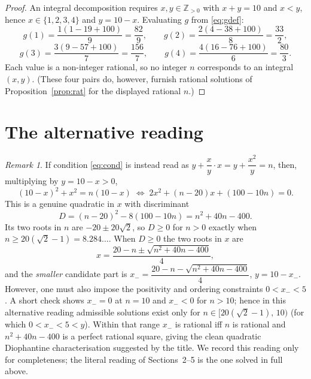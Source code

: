 \documentclass{amsart}
\theoremstyle{remark}
\newtheorem{remark}{Remark}
\begin{document}
\begin{proof}
An integral decomposition requires $x,y\in\mathbb{Z}_{>0}$ with $x+y=10$ and
$x<y$, hence $x\in\{1,2,3,4\}$ and $y=10-x$. Evaluating $g$ from
\eqref{eq:gdef}:
\[
g(1)=\frac{1(1-19+100)}{9}=\frac{82}{9},\qquad
g(2)=\frac{2(4-38+100)}{8}=\frac{33}{2},
\]
\[
g(3)=\frac{3(9-57+100)}{7}=\frac{156}{7},\qquad
g(4)=\frac{4(16-76+100)}{6}=\frac{80}{3}.
\]
Each value is a non-integer rational, so no integer $n$ corresponds to an
integral $(x,y)$. (These four pairs do, however, furnish rational solutions of
Proposition~\ref{prop:rat} for the displayed rational $n$.)
\end{proof}

\section{The alternative reading}\label{sec:alt}

\begin{remark}\label{rem:alt}
If condition \eqref{eq:cond} is instead read as
$y+\dfrac{x}{y}\cdot x=y+\dfrac{x^{2}}{y}=n$, then, multiplying by $y=10-x>0$,
\[
(10-x)^{2}+x^{2}=n(10-x)
\;\Longleftrightarrow\;
2x^{2}+(n-20)x+(100-10n)=0 .
\]
This is a genuine quadratic in $x$ with discriminant
\[
D=(n-20)^{2}-8(100-10n)=n^{2}+40n-400 .
\]
Its two roots in $n$ are $-20\pm20\sqrt2$, so $D\ge0$ for $n>0$ exactly when
$n\ge 20(\sqrt2-1)=8.284\ldots$. When $D\ge0$ the two roots in $x$ are
\[
x=\frac{20-n\pm\sqrt{n^{2}+40n-400}}{4},
\]
and the \emph{smaller} candidate part is
$x_{-}=\dfrac{20-n-\sqrt{n^{2}+40n-400}}{4}$, $y=10-x_{-}$. However, one must
also impose the positivity and ordering constraints $0<x_-<5$. A short check
shows $x_-=0$ at $n=10$ and $x_-<0$ for $n>10$; hence in this alternative
reading admissible solutions exist only for
$n\in\bigl[20(\sqrt2-1),\,10\bigr)$ (for which $0<x_-<5<y$). Within that range
$x_-$ is rational iff $n$ is rational and $n^{2}+40n-400$ is a perfect rational
square, giving the clean quadratic Diophantine characterisation suggested by the
title.
We record this reading only for completeness; the literal reading of
Sections~2--5 is the one solved in full above.
\end{remark}
\end{document}
